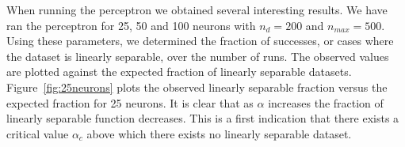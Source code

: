 When running the perceptron we obtained several interesting results. We have ran the perceptron for 25, 50 and 100 neurons with $n_d = 200$ and $n_{max} = 500$. 
Using these parameters, we determined the fraction of successes, or cases where the dataset is linearly separable, over the number of runs. 
The observed values are plotted against the expected fraction of linearly separable datasets.
Figure~\ref{fig:25neurons} plots the observed linearly separable fraction versus the expected fraction for 25 neurons. 
It is clear that as $\alpha$ increases the fraction of linearly separable function decreases. 
This is a first indication that there exists a critical value $\alpha_{c}$ above which there exists no linearly separable dataset. 
